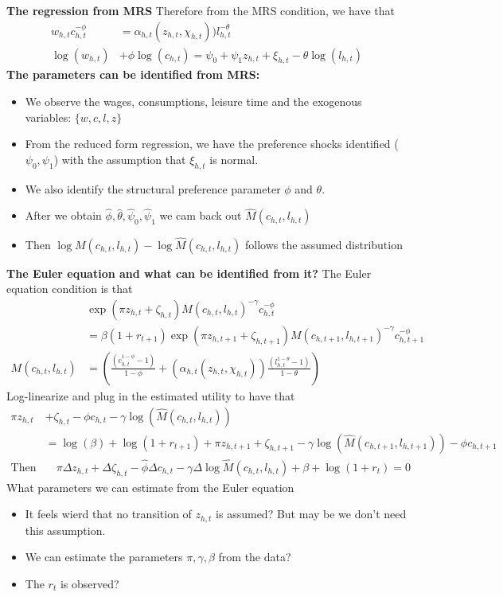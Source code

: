 \textbf{The regression from MRS}
Therefore from the MRS condition, we have that
\[\begin{split}
   w_{h,t}c_{h,t}^{-\phi} &= \alpha_{h,t}(z_{h,t},\chi_{h,t})) l_{h,t}^{-\theta}  \\
   \log(w_{h,t})& + \phi \log(c_{h,t})  = \psi_0 + \psi_1 z_{h,t} + \xi_{h,t} - \theta \log(l_{h,t})
\end{split} \]
\textbf{The parameters can be identified from MRS:}
\begin{itemize}
  \item We observe the wages, consumptions, leisure time and the exogenous variables: $\{w,c,l,z\}$
  \item From the reduced form regression, we have the preference shocks identified ($\psi_0,\psi_1$) with the assumption that $\xi_{h,t}$ is normal.
  \item We also identify the structural preference parameter $\phi$ and $\theta$.
  \item After we obtain $\hat{\phi},\hat{\theta},\hat{\psi}_0,\hat{\psi}_1$ we cam back out $\hat{M}(c_{h,t},l_{h,t})$
  \item {\color{red} Then $\log M(c_{h,t}, l_{h,t}) - \log \hat{M}(c_{h,t},l_{h,t})$ follows the assumed distribution}
\end{itemize}
\textbf{The Euler equation and what can be identified from it?}
The Euler equation condition is that
\[ \begin{split}
  & \exp{( \pi z_{h,t} + \zeta_{h,t} )} M(c_{h,t},l_{h,t})^{-\gamma} c_{h,t}^{-\phi} \\
  & = \beta (1+r_{t+1}) \exp{( \pi z_{h,t+1} + \zeta_{h,t+1} )} M(c_{h,t+1},l_{h,t+1})^{-\gamma} c_{h,t+1}^{-\phi} \\
  M(c_{h,t},l_{h,t}) & = \left( \frac{(c_{h,t}^{1 - \phi} - 1)}{1 - \phi} + (\alpha_{h,t}(z_{h,t},\chi_{h,t})) \frac{(l_{h,t}^{1 - \theta} -1)}{ 1 - \theta}\right)
\end{split} \]
Log-linearize and plug in the estimated utility to have that
\[ \begin{split}
  \pi z_{h,t} & + \zeta_{h,t} - \phi c_{h,t} - \gamma \log(\hat{M}(c_{h,t},l_{h,t})) \\ & = \log(\beta) + \log(1+r_{t+1}) + \pi z_{h,t+1} + \zeta_{h,t+1} - \gamma \log(\hat{M}(c_{h,t+1},l_{h,t+1})) - \phi c_{h,t+1} \\
  \text{Then we have}& \quad  \pi \Delta z_{h,t} + \Delta \zeta_{h,t} - \hat{\phi} \Delta c_{h,t} - \gamma \Delta \log \hat{M}(c_{h,t},l_{h,t}) + \beta + \log(1+r_t)= 0
\end{split} \]
What parameters we can estimate from the Euler equation
\begin{itemize}
  \item It feels wierd that no transition of $z_{h,t}$ is assumed? But may be we don't need this assumption.
  \item We can estimate the parameters $\pi,\gamma,\beta$ from the data?
  \item {\color{red} The $r_{t}$ is observed? }
\end{itemize}

